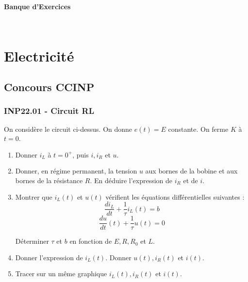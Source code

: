 










\begin{tcolorbox}[colback=white,colframe=black!75!black]
\par
\begin{center}
    \LARGE{\textbf{Banque d'Exercices}}
\vspace{0.5em}
\end{center}
\end{tcolorbox}

\tableofcontents
\newpage
~
\vfill

\newpage

\section*{Electricité}

\subsection*{Concours CCINP}

\subsubsection*{INP22.01 - Circuit RL  \lesdeux}

\begin{center}
\end{center}
On considère le circuit ci-dessus. On donne $e(t)=E$ constante. On ferme $K$ à $t=0$. 

\begin{enumerate}
\item Donner $i_L$ à $t=0^+$, puis $i, i_R$ et $u$.
\item Donner, en régime permanent, la tension $u$ aux bornes de la bobine et aux bornes de la résistance $R$. En déduire l'expression de $i_R$ et de $i$.
\item Montrer que $i_L (t)$ et $u(t)$ vérifient les équations différentielles suivantes :
$$
\frac{di_L}{dt}+\frac{1}{\tau} i_L (t)= b   
$$
$$
\frac{du}{dt}(t)+\frac{1}{\tau} u(t)= 0
$$

Déterminer $\tau$  et $b$ en fonction de $E,R,R_0$ et $L$.

\item Donner l'expression de $i_L(t)$. Donner $u(t),i_R (t)$ et $i(t)$.
\item Tracer sur un même graphique $i_L (t),i_R (t)$ et $i(t)$. 

\end{enumerate}

